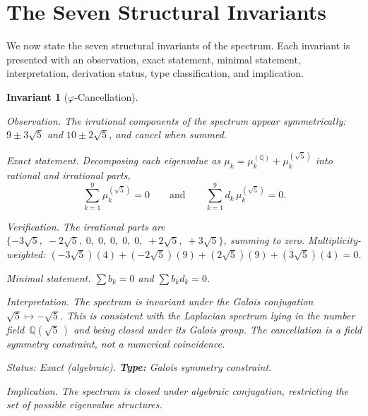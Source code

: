 \documentclass[12pt,a4paper]{article}
\newcommand{\vphi}{\varphi}
\newcommand{\Q}{\mathbb{Q}}
\newtheorem{invariant}{Invariant}
\begin{document}
\section{The Seven Structural Invariants}\label{sec:invariants}

We now state the seven structural invariants of the spectrum.  Each
invariant is presented with an observation, exact statement, minimal
statement, interpretation, derivation status, type classification, and
implication.

\begin{invariant}[$\vphi$-Cancellation]\label{inv:phi}

\emph{Observation.}
The irrational components of the spectrum appear symmetrically:
$9 \pm 3\sqrt{5}$ and $10 \pm 2\sqrt{5}$, and cancel when summed.

\emph{Exact statement.}
Decomposing each eigenvalue as $\mu_k = \mu_k^{(\Q)} + \mu_k^{(\sqrt{5})}$
into rational and irrational parts,
\begin{equation}\label{eq:phi_cancel}
  \sum_{k=1}^{9} \mu_k^{(\sqrt{5})} = 0
  \qquad\text{and}\qquad
  \sum_{k=1}^{9} d_k \, \mu_k^{(\sqrt{5})} = 0.
\end{equation}

\emph{Verification.}
The irrational parts are $\{-3\sqrt{5},\; -2\sqrt{5},\; 0,\; 0,\; 0,\;
0,\; 0,\; +2\sqrt{5},\; +3\sqrt{5}\}$, summing to zero.
Multiplicity-weighted: $(-3\sqrt{5})(4) + (-2\sqrt{5})(9) +
(2\sqrt{5})(9) + (3\sqrt{5})(4) = 0$.

\emph{Minimal statement.}
$\sum b_k = 0$ and $\sum b_k d_k = 0$.

\emph{Interpretation.}
The spectrum is invariant under the Galois conjugation
$\sqrt{5} \mapsto -\sqrt{5}$.  This is consistent with the Laplacian
spectrum lying in the number field~$\Q(\sqrt{5}\,)$ and being closed
under its Galois group.  The cancellation is a field symmetry
constraint, not a numerical coincidence.

\emph{Status:} Exact (algebraic). \quad
\textbf{Type:} Galois symmetry constraint.

\emph{Implication.}
The spectrum is closed under algebraic conjugation, restricting
the set of possible eigenvalue structures.
\end{invariant}
\end{document}
